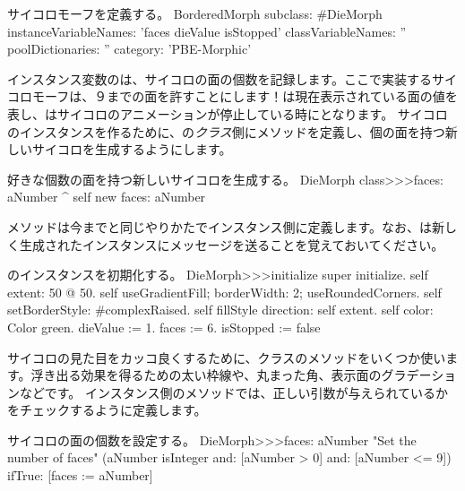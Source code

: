 \documentclass[a4paper,10pt,twoside]{book}
\begin{document}

\begin{classdef}{サイコロモーフを定義する。}
BorderedMorph subclass: #DieMorph
	instanceVariableNames: 'faces dieValue isStopped'
	classVariableNames: ''
	poolDictionaries: ''
	category: 'PBE-Morphic'
\end{classdef}

インスタンス変数のは、サイコロの面の個数を記録します。ここで実装するサイコロモーフは、９までの面を許すことにします！は現在表示されている面の値を表し、はサイコロのアニメーションが停止している時にとなります。
サイコロのインスタンスを作るために、の\emph{クラス}側にメソッドを定義し、個の面を持つ新しいサイコロを生成するようにします。
\begin{method}{好きな個数の面を持つ新しいサイコロを生成する。}
DieMorph class>>>faces: aNumber
	^ self new faces: aNumber
\end{method}

メソッドは今までと同じやりかたでインスタンス側に定義します。なお、は新しく生成されたインスタンスにメッセージを送ることを覚えておいてください。
\begin{method}{のインスタンスを初期化する。}
DieMorph>>>initialize
	super initialize.
	self extent: 50 @ 50.
	self useGradientFill; borderWidth: 2; useRoundedCorners.
	self setBorderStyle: #complexRaised.
	self fillStyle direction: self extent.
	self color: Color green.
	dieValue := 1.
	faces := 6.
	isStopped := false
\end{method}

サイコロの見た目をカッコ良くするために、クラスのメソッドをいくつか使います。浮き出る効果を得るための太い枠線や、丸まった角、表示面のグラデーションなどです。
インスタンス側のメソッドでは、正しい引数が与えられているかをチェックするように定義します。
\begin{method}{サイコロの面の個数を設定する。}
DieMorph>>>faces: aNumber
	"Set the number of faces"
	(aNumber isInteger
			and: [aNumber > 0]
			and: [aNumber <= 9])
		ifTrue: [faces := aNumber]
\end{method}
\end{document}
